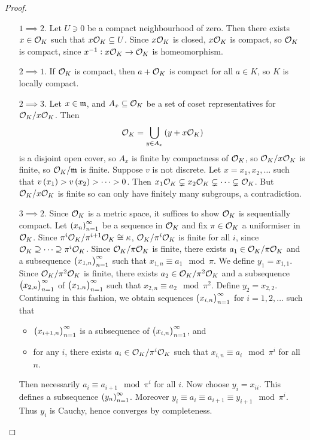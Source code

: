 \begin{proof}
\hfill
\begin{itemize}[leftmargin=0.5in]
\item[$ 1 \implies 2 $.] Let $ U \ni 0 $ be a compact neighbourhood of zero. Then there exists $ x \in \mathcal{O}_K $ such that $ x\mathcal{O}_K \subseteq U $. Since $ x\mathcal{O}_K $ is closed, $ x\mathcal{O}_K $ is compact, so $ \mathcal{O}_K $ is compact, since $ x^{-1} : x\mathcal{O}_K \to \mathcal{O}_K $ is homeomorphism.
\item[$ 2 \implies 1 $.] If $ \mathcal{O}_K $ is compact, then $ a + \mathcal{O}_K $ is compact for all $ a \in K $, so $ K $ is locally compact.
\item[$ 2 \implies 3 $.] Let $ x \in \mathfrak{m} $, and $ A_x \subseteq \mathcal{O}_K $ be a set of coset representatives for $ \mathcal{O}_K / x\mathcal{O}_K $. Then
$$ \OOO_K = \bigcup_{y \in A_x} \br{y + x\OOO_K} $$
is a disjoint open cover, so $ A_x $ is finite by compactness of $ \mathcal{O}_K $, so $ \mathcal{O}_K / x\mathcal{O}_K $ is finite, so $ \mathcal{O}_K / \mathfrak{m} $ is finite. Suppose $ v $ is not discrete. Let $ x = x_1, x_2, \dots $ such that $ v\br{x_1} > v\br{x_2} > \dots > 0 $. Then $ x_1\mathcal{O}_K \subsetneq x_2\mathcal{O}_K \subsetneq \dots \subsetneq \mathcal{O}_K $. But $ \mathcal{O}_K / x\mathcal{O}_K $ is finite so can only have finitely many subgroups, a contradiction.
\item[$ 3 \implies 2 $.] Since $ \mathcal{O}_K $ is a metric space, it suffices to show $ \mathcal{O}_K $ is sequentially compact. Let $ \br{x_n}_{n = 1}^\infty $ be a sequence in $ \mathcal{O}_K $ and fix $ \pi \in \mathcal{O}_K $ a uniformiser in $ \mathcal{O}_K $. Since $ \pi^i\mathcal{O}_K / \pi^{i + 1}\mathcal{O}_K \cong \kappa $, $ \mathcal{O}_K / \pi^i\mathcal{O}_K $ is finite for all $ i $, since $ \mathcal{O}_K \supseteq \dots \supseteq \pi^i\mathcal{O}_K $. Since $ \mathcal{O}_K / \pi\mathcal{O}_K $ is finite, there exists $ a_1 \in \mathcal{O}_K / \pi\mathcal{O}_K $ and a subsequence $ \br{x_{1, n}}_{n = 1}^\infty $ such that $ x_{1, n} \equiv a_1 \mod \pi $. We define $ y_1 = x_{1, 1} $. Since $ \mathcal{O}_K / \pi^2\mathcal{O}_K $ is finite, there exists $ a_2 \in \mathcal{O}_K / \pi^2\mathcal{O}_K $ and a subsequence $ \br{x_{2, n}}_{n = 1}^\infty $ of $ \br{x_{1, n}}_{n = 1}^\infty $ such that $ x_{2, n} \equiv a_2 \mod \pi^2 $. Define $ y_2 = x_{2, 2} $. Continuing in this fashion, we obtain sequences $ \br{x_{i, n}}_{n = 1}^\infty $ for $ i = 1, 2, \dots $ such that
\begin{itemize}
\item $ \br{x_{i + 1, n}}_{n = 1}^\infty $ is a subsequence of $ \br{x_{i, n}}_{n = 1}^\infty $, and
\item for any $ i $, there exists $ a_i \in \mathcal{O}_K / \pi^i\mathcal{O}_K $ such that $ x_{i, n} \equiv a_i \mod \pi^i $ for all $ n $.
\end{itemize}
Then necessarily $ a_i \equiv a_{i + 1} \mod \pi^i $ for all $ i $. Now choose $ y_i = x_{ii} $. This defines a subsequence $ \br{y_n}_{n = 1}^\infty $. Moreover $ y_i \equiv a_i \equiv a_{i + 1} \equiv y_{i + 1} \mod \pi^i $. Thus $ y_i $ is Cauchy, hence converges by completeness.
\end{itemize}
\end{proof}

